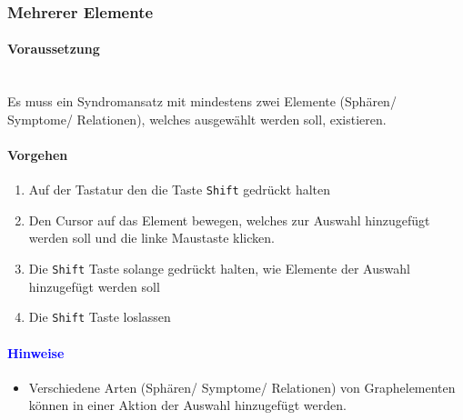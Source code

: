 \documentclass[enabledeprecatedfontcommands,fontsize=11pt,paper=a4,twoside]{scrartcl}
\newcounter{one}
\newcommand*{\hint}{\paragraph{\textcolor{blue}{Hinweise}}}
\newcommand*{\condition}{\paragraph{Voraussetzung}$\;$ \vspace{0.2cm}\\}
\newcommand*{\action}{\paragraph{Vorgehen}}
\begin{document}
	\begin{figure}[ht!]
		\centering
		
	\end{figure}	
	
	\newpage
	\subsubsection{Mehrerer Elemente}
	\condition
	Es muss ein Syndromansatz mit mindestens zwei Elemente (Sphären/ Symptome/ Relationen), welches ausgewählt werden soll, existieren. 
	\action
	\begin{enumerate}
		\item Auf der Tastatur den die Taste \texttt{Shift} gedrückt halten 
		\item Den Cursor auf das Element bewegen, welches zur Auswahl hinzugefügt werden soll und die linke Maustaste klicken. 
		\item Die \texttt{Shift} Taste solange gedrückt halten, wie Elemente der Auswahl hinzugefügt werden soll
		\item Die \texttt{Shift} Taste loslassen
	\end{enumerate}
	\hint
	\begin{itemize}
		\item Verschiedene Arten (Sphären/ Symptome/ Relationen) von Graphelementen können in einer Aktion der Auswahl hinzugefügt werden. \\ 
	\end{itemize}
\end{document}

